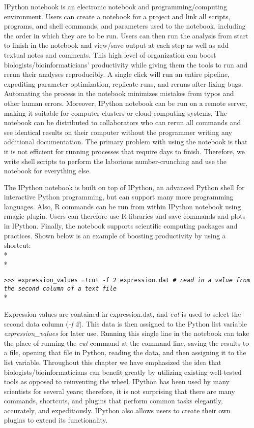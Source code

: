 \documentclass[ChapterTOCs,krantz2]{krantz} %
\begin{document}
IPython notebook is an
electronic notebook and programming/computing environment.  
Users can create a notebook for a project and link all scripts,
programs, and shell commands, and parameters used to the notebook, including
the order in which they are to be run.  Users can then run the analysis from start to
finish in the notebook and view/save output at each step as well as add textual
notes and comments.   This high level of organization can boost
biologists/bioinformaticians' productivity while giving them the tools to run
and rerun their analyses reproducibly.  A single click will run an entire
pipeline, expediting parameter optimization, replicate runs, and reruns after
fixing bugs.  Automating the process in the notebook minimizes mistakes from
typos and other human errors.  Moreover, IPython notebook can be run on a
remote server, making it suitable for computer clusters or
cloud computing systems. The notebook can be distributed to
collaborators who can rerun all commands and see identical results on their
computer without the programmer writing any additional documentation.
The primary problem with using the notebook is that it is not efficient
for running processes that require days to finish.  Therefore, we write
shell scripts to perform the laborious number-crunching and use the notebook
for everything else.

The IPython notebook is built on top of IPython, an advanced Python shell for
interactive Python programming, but can support many more programming
languages.  Also, R commands can be run from within IPython notebook using
rmagic plugin. 
Users can therefore use R libraries and save commands and plots in IPython.
Finally, the notebook supports scientific computing packages and practices. 
Shown below is an example of boosting productivity by using a shortcut:\\*\\*

\texttt{>>> expression\_values =!cut -f 2 expression.dat \emph{\# read in a
value from the second column of a text file}}\\*

Expression values are contained in expression.dat, and 
\emph{cut} is used to select the second data
column (\emph{-f 2}).  This data is then assigned to the Python list variable
\emph{expression\_values} for later use.  Running this single line in
the notebook can take the place of running the \emph{cut} command at the command line,
saving the results to a file, opening that file in Python, reading the data,
and then assigning it to the list variable.  Throughout this chapter we have
emphasized the idea that biologists/bioinformaticians can benefit greatly by
utilizing existing well-tested tools as opposed to reinventing the wheel.
IPython has been used by many scientists for several years; therefore, it is
not surprising that there are many commands, shortcuts, and plugins that
perform common tasks elegantly, accurately, and expeditiously.  
IPython also allows users to
create their own plugins to extend its functionality.
\end{document}
